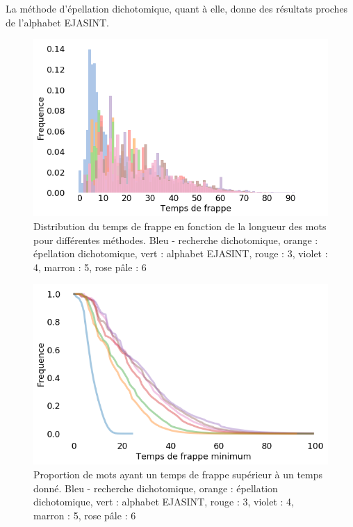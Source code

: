 \documentclass[twoside,twocolumn]{article}
\begin{document}
La méthode d'épellation dichotomique, quant à elle, donne des résultats proches de l'alphabet EJASINT.
\begin{center}
\begin{figure}
  \includegraphics[scale=0.35]{distrib.png}
  \caption{Distribution du temps de frappe en fonction de la longueur des mots pour différentes méthodes. Bleu - recherche dichotomique, orange : épellation dichotomique, vert : alphabet EJASINT, rouge : 3, violet : 4, marron : 5, rose pâle : 6}
  \label{distrib}
\end{figure}
\end{center}

\begin{center}
\begin{figure}
  \includegraphics[scale=0.35]{frappe-mini.png}
  \caption{Proportion de mots ayant un temps de frappe supérieur à un temps donné. Bleu - recherche dichotomique, orange : épellation dichotomique, vert : alphabet EJASINT, rouge : 3, violet : 4, marron : 5, rose pâle : 6}
  \label{frappe-mini}
\end{figure}
\end{center}
\end{document}
